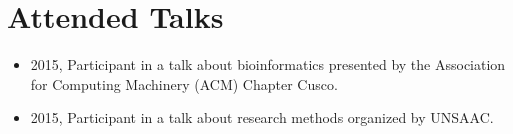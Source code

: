 \documentclass[11pt,a4paper,sans]{moderncv}        %
\begin{document}
\section{Attended Talks}
\begin{itemize}
\item{2015, Participant in a talk about bioinformatics presented by the Association for Computing Machinery (ACM) Chapter Cusco.}
\item{2015, Participant in a talk about research methods organized by UNSAAC.}

\end{itemize}
\end{document}
